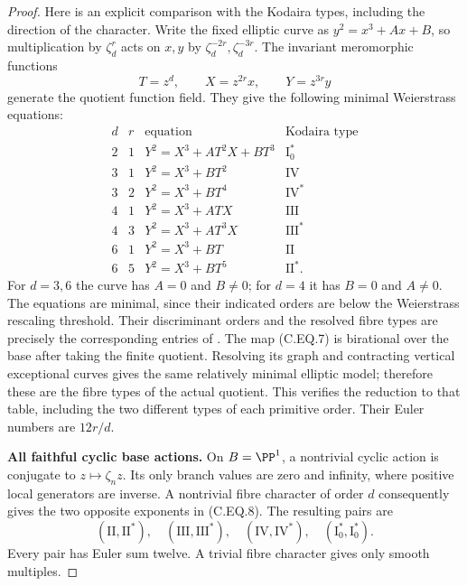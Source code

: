 \begin{proof}
Here is an explicit comparison with the Kodaira
types, including the direction of the character.
Write the fixed elliptic curve as
$y^2=x^3+Ax+B$, so multiplication by $\zeta_d^r$
acts on $x,y$ by $\zeta_d^{-2r},\zeta_d^{-3r}$.
The invariant meromorphic functions
\[
          T=z^d,\qquad X=z^{2r}x,\qquad Y=z^{3r}y
                                                               \tag{C.EQ.7}
\]
generate the quotient function field. They give
the following minimal Weierstrass equations:
\[
\begin{array}{c|c|c|c}
d&r&\text{equation}&\text{Kodaira type}\\ \hline
2&1&Y^2=X^3+AT^2X+BT^3&\mathrm I_0^*\\
3&1&Y^2=X^3+BT^2&\mathrm{IV}\\
3&2&Y^2=X^3+BT^4&\mathrm{IV}^*\\
4&1&Y^2=X^3+ATX&\mathrm{III}\\
4&3&Y^2=X^3+AT^3X&\mathrm{III}^*\\
6&1&Y^2=X^3+BT&\mathrm{II}\\
6&5&Y^2=X^3+BT^5&\mathrm{II}^* .
\end{array}                                                   \tag{C.EQ.8}
\]
For $d=3,6$ the curve has $A=0$ and $B\ne0$;
for $d=4$ it has $B=0$ and $A\ne0$.
The equations are minimal, since their indicated
orders are below the Weierstrass rescaling threshold.
Their discriminant orders and the resolved fibre
types are precisely the corresponding entries of
\cite[Theorem~6.2 and Table~I]{Kodaira1963II}.
The map (C.EQ.7) is birational over the base
after taking the finite quotient. Resolving its
graph and contracting vertical exceptional curves
gives the same relatively minimal elliptic model;
therefore these are the fibre types of the actual
quotient. This verifies the reduction to that table,
including the two different types of each primitive
order. Their Euler numbers are $12r/d$.

\par\medskip\noindent\textbf{All faithful cyclic base actions.}
On $B=\PP^1$, a nontrivial cyclic action is conjugate
to $z\mapsto\zeta_nz$. Its only branch values are
zero and infinity, where positive local generators
are inverse. A nontrivial fibre character of order
$d$ consequently gives the two opposite exponents
in (C.EQ.8). The resulting pairs are
\[
 (\mathrm{II},\mathrm{II}^*),\quad
 (\mathrm{III},\mathrm{III}^*),\quad
 (\mathrm{IV},\mathrm{IV}^*),\quad
 (\mathrm I_0^*,\mathrm I_0^*).                         \tag{C.EQ.9}
\]
Every pair has Euler sum twelve. A trivial fibre
character gives only smooth multiples.


\end{proof}
